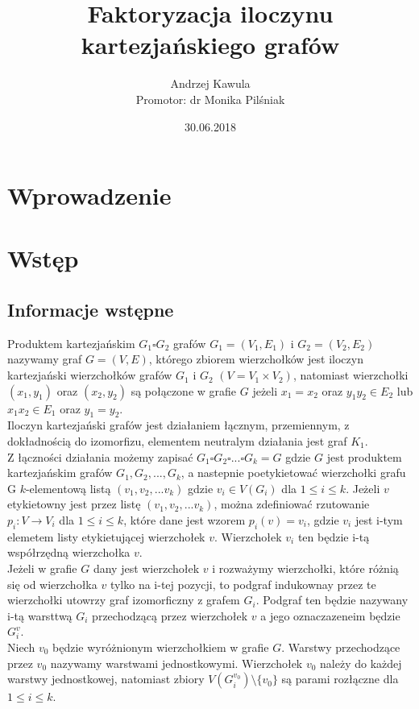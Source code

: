 \documentclass[12pt,a4paper,titlepage]{article}
\title{Faktoryzacja iloczynu kartezjańskiego grafów }
\date{30.06.2018}
\author{Andrzej Kawula \\ Promotor: dr Monika Pilśniak}
\begin{document}
\maketitle
\tableofcontents
\newpage
\section{Wprowadzenie}
\section{Wstęp}
\subsection{Informacje wstępne}
Produktem kartezjańskim $G_1 \square G_2 $ grafów $G_1 = (V_1 , E_1 ) $ i $ G_2 =(V_2 , E_2 ) $ nazywamy graf $G = (V, E)$, którego zbiorem wierzchołków jest iloczyn kartezjański wierzchołków grafów $G_1$ i $G_2$ $(V=V_1 \times V_2 )$, natomiast wierzchołki $(x_1, y_1)$ oraz $(x_2, y_2)$ są połączone w grafie $G$ jeżeli $x_1 = x_2$ oraz $y_1 y_2 \in E_2 $ lub $x_1 x_2 \in E_1 $ oraz $y_1 = y_2 $.\\
Iloczyn kartezjański grafów jest działaniem łącznym, przemiennym, z dokładnością do izomorfizu, elementem neutralym działania jest graf $K_1$.\\
Z łączności działania możemy zapisać $G_1 \square G_2 \square ... \square G_k = G$ gdzie $G$ jest produktem kartezjańskim grafów $G_1, G_2, ... , G_k$, a nastepnie poetykietować wierzchołki grafu G $k$-elementową listą $(v_1, v_2 , ... v_k )$ gdzie $v_i \in V(G_i)$ dla $1 \leqslant i \leqslant k $. Jeżeli $v$ etykietowny jest przez listę $(v_1, v_2 , ... v_k )$, można zdefiniować rzutowanie $p_i : V \rightarrow V_i $ dla $1 \leqslant i \leqslant k $, które dane jest wzorem $p_i (v) = v_i $, gdzie $v_i$ jest i-tym elemetem listy etykietującej wierzchołek $v$. Wierzchołek $v_i $ ten będzie i-tą współrzędną wierzchołka $v$.  \\
Jeżeli w grafie $G$ dany jest wierzchołek $v$ i rozważymy wierzchołki, które różnią się od wierzchołka $v$ tylko na i-tej pozycji, to podgraf indukownay przez te wierzchołki utowrzy graf izomorficzny  z grafem $G_i$. Podgraf ten będzie nazywany i-tą warsttwą $G_i$ przechodzącą przez wierzchołek $v$ a jego oznaczazeneim będzie $G_i ^v$.\\
Niech $v_0$ będzie wyróżnionym wierzchołkiem w grafie $G$. Warstwy przechodzące przez $v_0$ nazywamy warstwami jednostkowymi. Wierzchołek $v_0$ należy do każdej warstwy jednostkowej, natomiast zbiory $V(G_i ^{v_0}) \setminus \{v_0\}$ są parami rozłączne dla $1 \leqslant i \leqslant k $.
\end{document}
